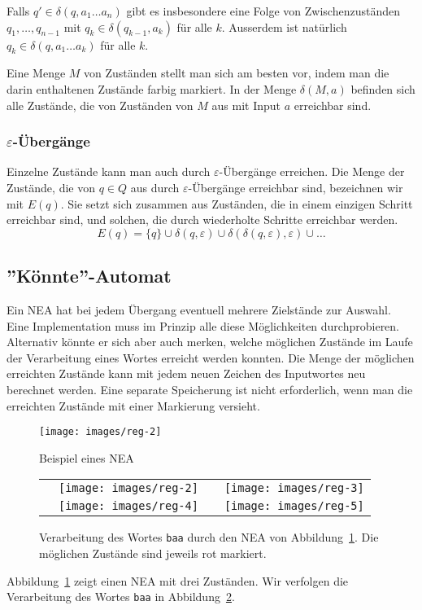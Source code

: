 Falls $q'\in\delta(q,a_1\dots a_n)$ gibt
es insbesondere eine Folge von Zwischenzuständen $q_1,\dots,q_{n-1}$
mit $q_k\in\delta(q_{k-1},a_k)$ für alle $k$.
Ausserdem  ist natürlich $q_k\in\delta(q,a_1\dots a_k)$ für alle $k$.

Eine Menge $M$ von Zuständen stellt man sich am besten vor, indem man die
darin enthaltenen Zustände farbig markiert.
In der Menge $\delta(M,a)$ befinden sich alle Zustände, die von Zuständen
von $M$ aus mit Input $a$ erreichbar sind.

\subsubsection{$\varepsilon$-Übergänge}
Einzelne Zustände kann man auch durch $\varepsilon$-Übergänge
erreichen.
Die Menge der Zustände, die von $q\in Q$ aus durch
$\varepsilon$-Übergänge erreichbar sind, bezeichnen wir mit
$E(q)$.
Sie setzt sich zusammen aus Zuständen, die in einem einzigen 
Schritt erreichbar sind, und solchen, die durch wiederholte
Schritte erreichbar werden.
\[
E(q)=\{q\} \cup \delta(q,\varepsilon) \cup \delta(\delta(q,\varepsilon),\varepsilon)\cup\dots
\]

\subsection{''Könnte''-Automat\label{Thompson-NEA}}
Ein NEA hat bei jedem Übergang eventuell mehrere Zielstände zur Auswahl.
Eine Implementation muss im Prinzip alle diese Möglichkeiten 
durchprobieren.
Alternativ könnte er sich aber auch merken,
welche möglichen Zustände im Laufe der Verarbeitung eines
Wortes erreicht werden konnten.
Die Menge der möglichen erreichten Zustände kann mit jedem
neuen Zeichen des Inputwortes neu berechnet werden.
Eine separate Speicherung ist nicht erforderlich, wenn man die
erreichten Zustände mit einer Markierung versieht.

\begin{figure}
\begin{center}
\texttt{[image: images/reg-2]}
\end{center}
\caption{Beispiel eines NEA\label{koenntenea}}
\end{figure}

\begin{figure}
\begin{center}
\begin{tabular}{cccc}
&%
\texttt{[image: images/reg-2]}&
\raisebox{60pt}{$\overset{\displaystyle\text{\tt b}}\longrightarrow$}&
\texttt{[image: images/reg-3]}\\
\raisebox{60pt}{$\overset{\displaystyle\text{\tt a}}\longrightarrow$}&
\texttt{[image: images/reg-4]}&
\raisebox{60pt}{$\overset{\displaystyle\text{\tt a}}\longrightarrow$}&
\texttt{[image: images/reg-5]}
\end{tabular}
\end{center}
\caption{Verarbeitung des Wortes {\tt baa} durch den NEA von
Abbildung~\ref{koenntenea}.
Die möglichen Zustände sind jeweils
rot markiert.\label{koenntebeispiel}
}
\end{figure}
Abbildung~\ref{koenntenea} zeigt einen NEA mit drei Zuständen.
Wir verfolgen die Verarbeitung des Wortes {\tt baa} in
Abbildung~\ref{koenntebeispiel}.


